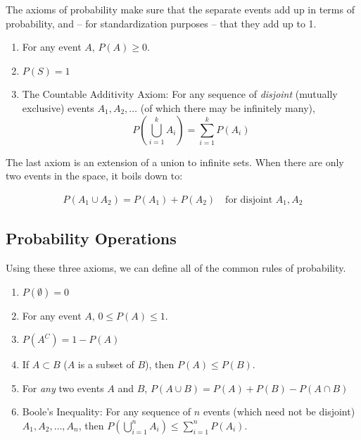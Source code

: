 \documentclass[]{book}
\providecommand{\tightlist}{%
  \setlength{\itemsep}{0pt}\setlength{\parskip}{0pt}}
\theoremstyle{definition}
\theoremstyle{definition}
\theoremstyle{definition}
\theoremstyle{remark}
\let\BeginKnitrBlock\begin \let\EndKnitrBlock\end
\begin{document}
The axioms of probability make sure that the separate events add up in terms of probability, and -- for standardization purposes -- that they add up to 1.

\BeginKnitrBlock{definition}[Axioms of Probability]
\protect\hypertarget{def:unnamed-chunk-67}{}{\label{def:unnamed-chunk-67} {} }

\begin{enumerate}
\def\labelenumi{\arabic{enumi}.}
\tightlist
\item
  For any event \(A\), \(P(A)\ge 0\).
\item
  \(P(S)=1\)
\item
  The Countable Additivity Axiom: For any sequence of \emph{disjoint} (mutually exclusive) events \(A_1,A_2,\ldots\) (of which there may be infinitely many), \[P\left( \bigcup\limits_{i=1}^k
  A_i\right)=\sum\limits_{i=1}^k P(A_i)\]
\end{enumerate}

The last axiom is an extension of a union to infinite sets. When there are only two events in the space, it boils down to:

\begin{align*}
P(A_1 \cup A_2) = P(A_1) + P(A_2) \quad\text{for disjoint } A_1, A_2
\end{align*}
\EndKnitrBlock{definition}

\hypertarget{probability-operations}{%
\subsection*{Probability Operations}\label{probability-operations}}

Using these three axioms, we can define all of the common rules of probability.

\begin{enumerate}
\def\labelenumi{\arabic{enumi}.}
\tightlist
\item
  \(P(\emptyset)=0\)
\item
  For any event \(A\), \(0\le P(A) \le 1\).
\item
  \(P({A}^C)=1-P(A)\)
\item
  If \(A\subset B\) (\(A\) is a subset of \(B\)), then \(P(A)\le P(B)\).
\item
  For \emph{any} two events \(A\) and \(B\), \(P(A\cup B)=P(A)+P(B)-P(A\cap B)\)
\item
  Boole's Inequality: For any sequence of \(n\) events (which need not be disjoint) \(A_1,A_2,\ldots,A_n\), then \(P\left( \bigcup\limits_{i=1}^n A_i\right) \leq \sum\limits_{i=1}^n P(A_i)\).
\end{enumerate}
\end{document}
